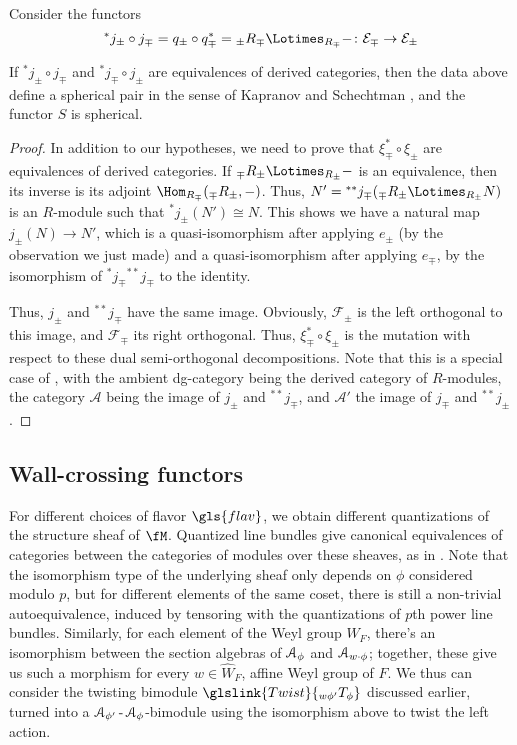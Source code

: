 Consider the functors \[{}^*j_{\pm}\circ j_{\mp}=q_{\pm}\circ q_{\mp}^*={}_{\pm}R_{\mp}\Lotimes_{R_{\mp}}-\colon  \mathcal{E}_{\mp}\to \mathcal{E}_{\pm} \]
\begin{lemma}\label{lem:equiv-sphere}
  If ${}^*j_{\pm}\circ j_{\mp}$ and ${}^*j_{\mp}\circ j_{\pm}$ are equivalences of derived categories, then the data above define a spherical pair in the sense of Kapranov and Schechtman \cite[\S 3.C]{KSschobers}, and the functor $S$ is spherical.
\end{lemma}
\begin{proof}
  In addition to our hypotheses, we need to prove that $\xi_{\mp}^*\circ \xi_{\pm}$ are equivalences of derived categories.  If ${}_{\mp}R_{\pm}\Lotimes_{R_{\pm}}-$ is an equivalence, then its inverse is its adjoint $\Hom_{R_{\mp}}({}_{\mp}R_{\pm},-)$.   Thus, $N'={}^{**}j_{\mp}( {}_{\mp}R_{\pm}\Lotimes_{R_{\pm}}N)$ is an $R$-module such that ${}^*j_{\pm}(N')\cong N$.  This shows we have a natural map $j_{\pm}(N)\to N'$, which is a quasi-isomorphism after applying $e_{\pm}$ (by the observation we just made) and a quasi-isomorphism after applying $e_{\mp}$, by the isomorphism of ${}^*j_{\mp}{}^{**}j_{\mp}$ to the identity.

  Thus, $j_{\pm}$ and ${}^{**}j_{\mp}$ have the same image.  Obviously, $\mathcal{F}_{\pm}$ is the left orthogonal to this image, and $\mathcal{F}_{\mp}$ its right orthogonal.  Thus, $\xi_{\mp}^*\circ \xi_{\pm}$ is the mutation with respect to these dual semi-orthogonal decompositions.  Note that this is a special case of \cite[Thm. 3.11]{HLS}, with the ambient dg-category being the derived category of $R$-modules, the category $\mathcal{A}$ being the image of $j_{\pm}$ and  ${}^{**}j_{\mp}$, and $\mathcal{A}'$ the image of $j_{\mp}$ and  ${}^{**}j_{\pm}$.
\end{proof}


\subsection{Wall-crossing functors}
\label{sec:wall-cross-funct}


For different choices of flavor $\gls{flav}$, we obtain different quantizations of
the structure sheaf of $\fM$.  Quantized line bundles give canonical
equivalences of categories between the categories of modules over
these sheaves, as in \cite{BLPWquant}.  Note that the isomorphism type
of the underlying sheaf only depends on $\phi$ considered modulo $p$,
but for different elements of the same coset, there is still a
non-trivial autoequivalence, induced by tensoring with the
quantizations of $p$th power line bundles.  Similarly, for each
element of the Weyl group $W_F$, there's an isomorphism between the
section algebras of $\EuScript{A}_{\phi}$ and $ \EuScript{A}_{w\cdot
  \phi}$; together, these give us such a morphism for every $w\in
\widehat{W}_F$, affine Weyl group of $F$.  We thus can consider the twisting bimodule
$\glslink{Twist}{{}_{w\phi'}T_{\phi}}$ discussed earlier, turned into a
$\EuScript{A}_{\phi'}\operatorname{-}\EuScript{A}_{\phi}$-bimodule
using the isomorphism above to twist the left action.

